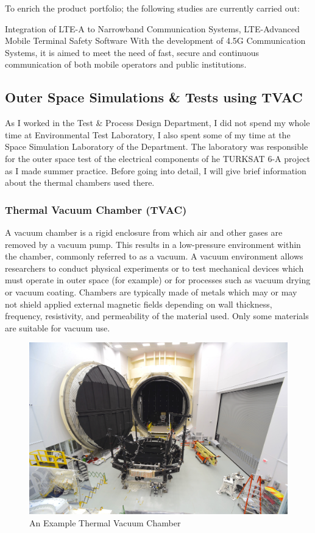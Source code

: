 	To enrich the product portfolio; the following studies are currently carried out:

	Integration of LTE-A to Narrowband Communication Systems,
LTE-Advanced Mobile Terminal Safety Software  
With the development of 4.5G Communication Systems, it is aimed to meet the need of fast, secure and continuous communication of both mobile operators and public institutions\cite{ulak}.


\vfill


\subsection{Outer Space Simulations \& Tests using TVAC  }
\- \indent
	As I worked in the Test \& Process Design Department, I did not spend my whole time at Environmental Test Laboratory, I also spent some of my time at the Space Simulation Laboratory of the Department. The laboratory was responsible for the outer space test of the electrical components of he TURKSAT 6-A project as I made summer practice. Before going into detail, I will give brief information about the thermal chambers used there.
	
\subsubsection{Thermal Vacuum Chamber (TVAC) }
\- \indent
	A vacuum chamber is a rigid enclosure from which air and other gases are removed by a vacuum pump. This results in a low-pressure environment within the chamber, commonly referred to as a vacuum. A vacuum environment allows researchers to conduct physical experiments or to test mechanical devices which must operate in outer space (for example) or for processes such as vacuum drying or vacuum coating. Chambers are typically made of metals which may or may not shield applied external magnetic fields depending on wall thickness, frequency, resistivity, and permeability of the material used. Only some materials are suitable for vacuum use\cite{tvac}.


\begin{figure}[h!]
	\center
	\setlength{\unitlength}{\textwidth} 
	\includegraphics[width=1.0\unitlength]{tvac}
	\caption{\label{fig:tvac}An Example Thermal Vacuum Chamber \cite{tvac}}
\end{figure}

